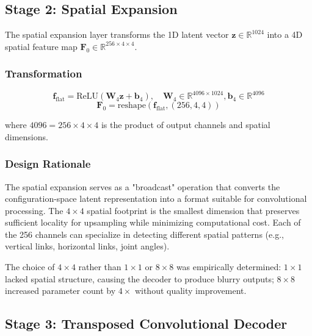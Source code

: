\documentclass[12pt,a4paper,oneside]{report}
\begin{document}
\subsection{Stage 2: Spatial Expansion}

The spatial expansion layer transforms the 1D latent vector $\mathbf{z} \in \mathbb{R}^{1024}$ into a 4D spatial feature map $\mathbf{F}_0 \in \mathbb{R}^{256 \times 4 \times 4}$.

\subsubsection{Transformation}

\begin{equation}
\mathbf{f}_{\text{flat}} = \text{ReLU}(\mathbf{W}_4 \mathbf{z} + \mathbf{b}_4), \quad \mathbf{W}_4 \in \mathbb{R}^{4096 \times 1024}, \mathbf{b}_4 \in \mathbb{R}^{4096}
\end{equation}
\begin{equation}
\mathbf{F}_0 = \text{reshape}(\mathbf{f}_{\text{flat}}, (256, 4, 4))
\end{equation}

where $4096 = 256 \times 4 \times 4$ is the product of output channels and spatial dimensions.

\subsubsection{Design Rationale}

The spatial expansion serves as a "broadcast" operation that converts the configuration-space latent representation into a format suitable for convolutional processing. The $4 \times 4$ spatial footprint is the smallest dimension that preserves sufficient locality for upsampling while minimizing computational cost. Each of the 256 channels can specialize in detecting different spatial patterns (e.g., vertical links, horizontal links, joint angles).

The choice of $4 \times 4$ rather than $1 \times 1$ or $8 \times 8$ was empirically determined: $1 \times 1$ lacked spatial structure, causing the decoder to produce blurry outputs; $8 \times 8$ increased parameter count by $4\times$ without quality improvement.

\subsection{Stage 3: Transposed Convolutional Decoder}
\end{document}
